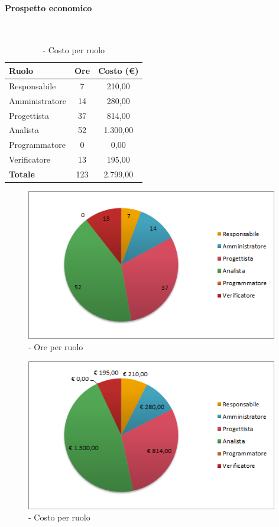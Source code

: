 \documentclass[../PianoDiProgetto.tex]{subfiles}
\begin{document}
	\paragraph{Prospetto economico}\
					
	\begin{table}[H]
		\centering
	
		\begin{tabular}{l * {2}{c}}
			\toprule
			\textbf{Ruolo} & \textbf{Ore} & \textbf{Costo (\euro{})} \\
			\midrule
			Responsabile & 7    & 210,00 \\
			Amministratore  & 14    & 280,00 \\
			Progettista  & 37    & 814,00 \\
			Analista & 52    & 1.300,00 \\
			Programmatore  & 0    & 0,00 \\
			Verificatore  & 13    & 195,00 \\
			\midrule
			\textbf{Totale}  & 123   & 2.799,00 \\
			\bottomrule
		\end{tabular}
		\caption{\PerPA{} - Costo per ruolo}
	\end{table}
\vfill	
	
	\begin{figure}[H]
		\centering
		\includegraphics[width=11cm, trim=1cm 0cm 1cm 0cm]{grafici/PA-ruolo}
			\caption{\PerPA{} - Ore per ruolo}
	\end{figure}
\vfill	
\newpage
\vfill
	\begin{figure}[H]
		\centering
		\includegraphics[width=11cm, trim=1cm 0cm 1cm 0cm]{grafici/PA-costo}
			\caption{\PerPA{} - Costo per ruolo}
	\end{figure}	
\vfill	
\end{document}
